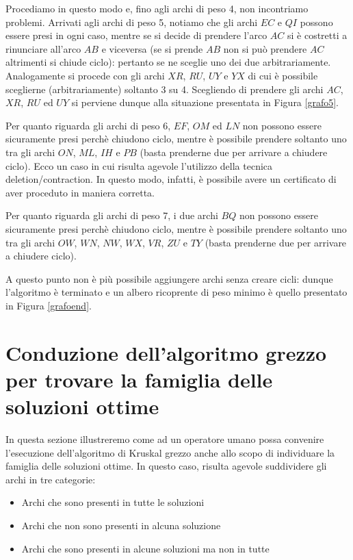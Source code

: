 \documentclass[12pt,a4paper,twoside]{article}
\theoremstyle{definition}
\theoremstyle{definition}
\theoremstyle{theorem}
\begin{document}
	Procediamo in questo modo e, fino agli archi di peso 4, non incontriamo problemi. Arrivati agli archi di peso 5, notiamo che gli archi $EC$ e $QI$ possono essere presi in ogni caso, mentre se si decide di prendere l'arco $AC$ si è costretti a rinunciare all'arco $AB$ e viceversa (se si prende $AB$ non si può prendere $AC$ altrimenti si chiude ciclo): pertanto se ne sceglie uno dei due arbitrariamente. Analogamente si procede con gli archi $XR$, $RU$, $UY$ e $YX$ di cui è possibile sceglierne (arbitrariamente) soltanto 3 su 4. Scegliendo di prendere gli archi $AC$, $XR$, $RU$ ed $UY$ si perviene dunque alla situazione presentata in Figura \ref{grafo5}.
	
	Per quanto riguarda gli archi di peso 6, $EF$, $OM$ ed $LN$ non possono essere sicuramente presi perchè chiudono ciclo, mentre è possibile prendere soltanto uno tra gli archi $ON$, $ML$, $IH$ e $PB$ (basta prenderne due per arrivare a chiudere ciclo). Ecco un caso in cui risulta agevole l'utilizzo della tecnica deletion/contraction. In questo modo, infatti, è possibile avere un certificato di aver proceduto in maniera corretta.
	
	Per quanto riguarda gli archi di peso 7, i due archi $BQ$ non possono essere sicuramente presi perchè chiudono ciclo, mentre è possibile prendere soltanto uno tra gli archi $OW$, $WN$, $NW$, $WX$, $VR$, $ZU$ e $TY$ (basta prenderne due per arrivare a chiudere ciclo).
	
	A questo punto non è più possibile aggiungere archi senza creare cicli: dunque l'algoritmo è terminato e un albero ricoprente di peso minimo è quello presentato in Figura \ref{grafoend}.
		
	\section{Conduzione dell'algoritmo grezzo per trovare la famiglia delle soluzioni ottime}
	In questa sezione illustreremo come ad un operatore umano possa convenire l'esecuzione dell'algoritmo di Kruskal grezzo anche allo scopo di individuare la famiglia delle soluzioni ottime.
	In questo caso, risulta agevole suddividere gli archi in tre categorie:
	\begin{itemize}
		\item Archi che sono presenti in tutte le soluzioni
		\item Archi che non sono presenti in alcuna soluzione		
		\item Archi che sono presenti in alcune soluzioni ma non in tutte
	\end{itemize}
	
\end{document}
